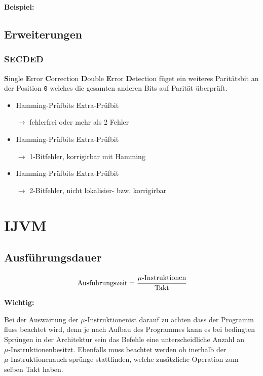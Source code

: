 \documentclass
[
	8pt,		%
	ngerman,	%
	a4paper,	%
	landscape,	%
	final		%
]{extarticle}
\newcommand{\cmark}{\textcolor{cmark}{\ding{51}}}
\newcommand{\xmark}{\textcolor{xmark}{\ding{55}}}
\newcommand*\important{\par\vspace{\abovedisplayskip}\textbf{Wichtig:}\par}
\newcommand*\example{\par\vspace{\abovedisplayskip}\textbf{Beispiel:}\par}
\newcommand{\includefigure}[1]{\begin{center}\end{center}}
\begin{document}
\begin{multicols*}{4}
\example
\includefigure{./Documents/Graphics/Hamming-Abbildung-2.tex}
\subsection{Erweiterungen}
\subsubsection*{SECDED}
\textbf{S}ingle \textbf{E}rror \textbf{C}orrection \textbf{D}ouble \textbf{E}rror
\textbf{D}etection füget ein weiteres Paritätsbit an der Position \texttt{0} welches
die gesamten anderen Bits auf Parität überprüft. \par
\begin{itemize}
	\item Hamming-Prüfbits \cmark \quad Extra-Prüfbit \cmark\par
	      $\longrightarrow$ fehlerfrei oder mehr als 2 Fehler
	\item Hamming-Prüfbits \xmark \quad Extra-Prüfbit \xmark\par
	      $\longrightarrow$ 1-Bitfehler, korrigirbar mit Hamming
	\item Hamming-Prüfbits \xmark \quad Extra-Prüfbit \cmark\par
	      $\longrightarrow$ 2-Bitfehler, nicht lokalisier- bzw. korrigirbar
\end{itemize}


\newcommand{\microinst}{\ensuremath{\mu\text{-Instruktionen}}}
\section{IJVM}
\subsection{Ausführungsdauer}
\[
	\text{Ausführungszeit} = \cfrac{\microinst}{\text{Takt}}
\]
\important Bei der Auswärtung der \microinst ist darauf zu achten dass der
Programm fluss beachtet wird, denn je nach Aufbau des Programmes kann es bei
bedingten Sprüngen in der Architektur sein das Befehle eine unterscheidliche
Anzahl an \microinst besitzt. Ebenfalls muss beachtet werden ob inerhalb der
\microinst auch sprünge stattfinden, welche zusätzliche Operation zum selben
Takt haben.

\end{multicols*}
\end{document}
